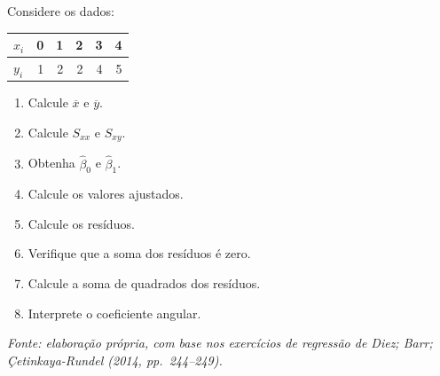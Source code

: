 \documentclass[
  letterpaper,
  DIV=11,
  numbers=noendperiod]{scrreprt}
\providecommand{\tightlist}{%
  \setlength{\itemsep}{0pt}\setlength{\parskip}{0pt}}\usepackage{longtable,booktabs,array}
\begin{document}
\begin{tcolorbox}[enhanced jigsaw, colback=white, leftrule=.75mm, colbacktitle=quarto-callout-tip-color!10!white, breakable, titlerule=0mm, bottomtitle=1mm, title=\textcolor{quarto-callout-tip-color}{\faLightbulb}\hspace{0.5em}{Exercício 2 --- Ajuste numérico}, colframe=quarto-callout-tip-color-frame, toprule=.15mm, opacityback=0, bottomrule=.15mm, opacitybacktitle=0.6, arc=.35mm, toptitle=1mm, rightrule=.15mm, coltitle=black, left=2mm]

Considere os dados:

\begin{longtable}[]{@{}lrrrrr@{}}
\toprule\noalign{}
\(x_i\) & 0 & 1 & 2 & 3 & 4 \\
\midrule\noalign{}
\endhead
\bottomrule\noalign{}
\endlastfoot
\(y_i\) & 1 & 2 & 2 & 4 & 5 \\
\end{longtable}

\begin{enumerate}
\def\labelenumi{\arabic{enumi}.}
\tightlist
\item
  Calcule \(\overline x\) e \(\overline y\).
\item
  Calcule \(S_{xx}\) e \(S_{xy}\).
\item
  Obtenha \(\widehat\beta_0\) e \(\widehat\beta_1\).
\item
  Calcule os valores ajustados.
\item
  Calcule os resíduos.
\item
  Verifique que a soma dos resíduos é zero.
\item
  Calcule a soma de quadrados dos resíduos.
\item
  Interprete o coeficiente angular.
\end{enumerate}

\emph{Fonte: elaboração própria, com base nos exercícios de regressão de
Diez; Barr; Çetinkaya-Rundel (2014, pp.~244--249).}

\end{tcolorbox}
\end{document}
